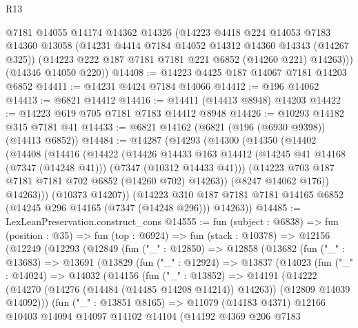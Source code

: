 \begin{lexlean}{R13}
\begin{coremodule}
        @7181
        @14055
        @14174
        @14362
        @14326
        (@14223
          @4418
          @224
          @14053
          @7183
          @14360
          @13058
          (@14231 @4414 @7184 @14052 @14312 @14360 @14343 (@14267 @325))
          (@14223 @222 @187 @7181 @7181 @221 @6852 (@14260 @221) @14263)))
      (@14346 @14050 @220))
@14408 := @14223 @4425 @187 @14067 @7181 @14203 @6852
@14411 := @14231 @4424 @7184 @14066
@14412 := @196 @14062
@14413 := @6821 @14412
@14416 := @14411 (@14413 @8948) @14203
@14422 := @14223 @619 @705 @7181 @7183 @14412 @8948
@14426 := @10293 @14182 @315 @7181 @41
@14433 := @6821 @14162 (@6821 (@196 (@6930 @9398)) (@14413 @6852))
@14484 := @14287
    (@14293
      (@14300
        (@14350
          (@14402
            (@14408
              (@14416
                (@14422
                  (@14426
                    @14433
                    @163
                    @14412
                    (@14245 @41 @14168 (@7347 (@14248 @41)))
                    (@7347 (@10312 @14433 @41)))
                  (@14223 @703 @187 @7181 @7181 @702 @6852 (@14260 @702) @14263))
                (@8247 @14062 @176))
              @14263)))
        (@10373 @14207))
      (@14223 @310 @187 @7181 @7181 @14165 @6852 (@14245 @296 @14165 (@7347 (@14248 @296))) @14263))
@14485 := LexLeanPreservation.construct_cons
@14555 := fun (subject : @6838) =>
  fun (position : @35) =>
  fun (top : @6924) =>
  fun (stack : @10378) =>
  @12156
    (@12249
      (@12293
        (@12849
          (fun ("_" : @12850) =>
          @12858
            (@13682
              (fun ("_" : @13683) =>
              @13691
                (@13829
                  (fun ("_" : @12924) =>
                  @13837
                    (@14023
                      (fun ("_" : @14024) =>
                      @14032
                        (@14156
                          (fun ("_" : @13852) =>
                          @14191
                            (@14222
                              (@14270 (@14276 (@14484 (@14485 @14208 @14214)) @14263))
                              (@12809 @14039 @14092)))
                          (fun ("_" : @13851 @8165) =>
                          @11079
                            (@14183 @4371)
                            @12166
                            @10403
                            @14094
                            @14097
                            @14102
                            @14104
                            (@14192
                              @4369
                              @206
                              @7183

\end{coremodule}
\end{lexlean}
